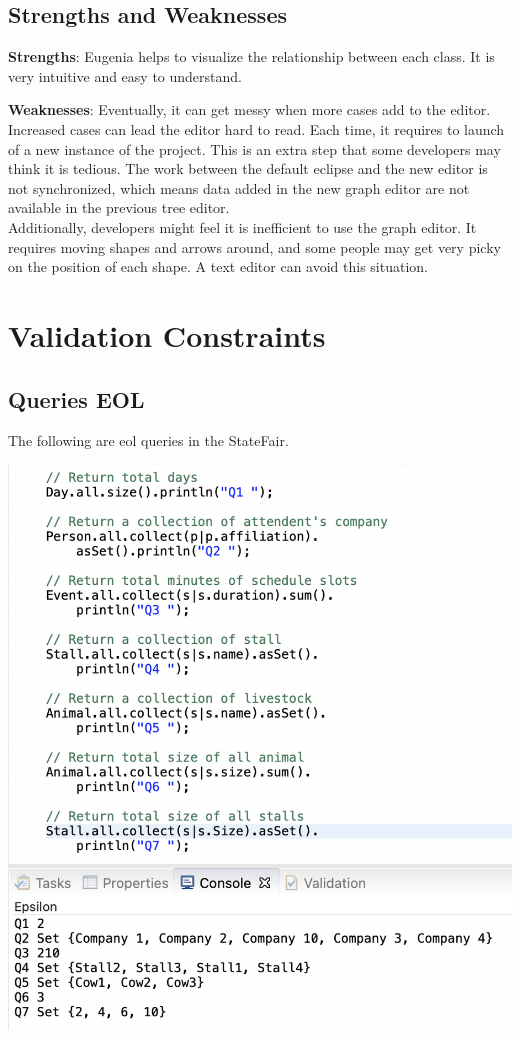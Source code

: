 \documentclass[12pt]{article}
\begin{document}
\subsection{Strengths and Weaknesses}
\noindent \textbf{Strengths}: 
Eugenia helps to visualize the relationship between each class. It is very intuitive and easy to understand.

\noindent \textbf{Weaknesses}: 
Eventually, it can get messy when more cases add to the editor. Increased cases can lead the editor hard to read. 
Each time, it requires to launch of a new instance of the project. This is an extra step that some developers may think it is 
tedious. The work between the default eclipse and the new editor is not synchronized, which means data added in the new graph editor 
are not available in the previous tree editor.
\\Additionally, developers might feel it is inefficient to use the graph editor. 
It requires moving shapes and arrows around, and some people may get very picky on the position of each shape. A text editor can 
avoid this situation.

\pagebreak
\section{Validation Constraints}
\subsection{Queries EOL}
The following are eol queries in the StateFair.

\includegraphics[scale = 0.6]{img/eol-queries}
\end{document}

